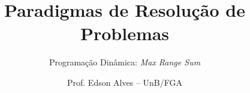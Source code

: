 \title{Paradigmas de Resolução de Problemas}
\subtitle{Programação Dinâmica: {\it Max Range Sum}}
\author{Prof. Edson Alves -- UnB/FGA}
\date{}
